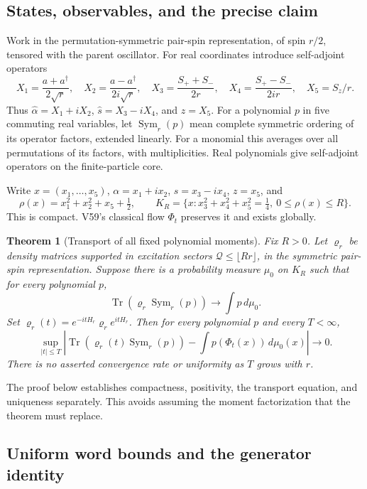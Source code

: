 \documentclass[11pt]{article}
\newtheorem{theorem}{Theorem}[section]
\theoremstyle{remark}
\begin{document}
\subsection{States, observables, and the precise claim}

Work in the permutation-symmetric pair-spin representation,
of spin \(r/2\), tensored with the parent oscillator.
For real coordinates introduce self-adjoint operators
\[
 X_1=\frac{a+a^\dagger}{2\sqrt r},\quad
 X_2=\frac{a-a^\dagger}{2i\sqrt r},\quad
 X_3=\frac{S_++S_-}{2r},\quad
 X_4=\frac{S_+-S_-}{2ir},\quad X_5=S_z/r .
\]
Thus \(\widehat\alpha=X_1+iX_2\),
\(\widehat s=X_3-iX_4\), and \(\widehat z=X_5\).
For a polynomial \(p\) in five commuting real variables,
let \(\operatorname{Sym}_r(p)\) mean complete symmetric
ordering of its operator factors, extended linearly.
For a monomial this averages over all permutations of
its factors, with multiplicities.  Real polynomials give
self-adjoint operators on the finite-particle core.

Write \(x=(x_1,\ldots,x_5)\), \(\alpha=x_1+ix_2\),
\(s=x_3-ix_4\), \(z=x_5\), and
\[
 \rho(x)=x_1^2+x_2^2+x_5+\tfrac12,\qquad
 K_R=\{x:x_3^2+x_4^2+x_5^2=\tfrac14,\ 0\leq\rho(x)\leq R\}.
\]
This is compact.  V59's classical flow \(\Phi_t\)
preserves it and exists globally.

\begin{theorem}[Transport of all fixed polynomial moments]
\label{thm:v20v61-transport}
Fix \(R>0\).  Let \(\varrho_r\) be density matrices supported
in excitation sectors
\(\mathcal Q\leq\lfloor Rr\rfloor\), in the symmetric
pair-spin representation.  Suppose there is a probability
measure \(\mu_0\) on \(K_R\) such that for every polynomial \(p\),
\[
 \operatorname{Tr}(\varrho_r\operatorname{Sym}_r(p))
                         \longrightarrow\int p\,d\mu_0 .
\]
Set \(\varrho_r(t)=e^{-itH_r}\varrho_re^{itH_r}\).
Then for every polynomial \(p\) and every \(T<\infty\),
\[
 \sup_{|t|\leq T}
 \left|\operatorname{Tr}(\varrho_r(t)\operatorname{Sym}_r(p))
               -\int p(\Phi_t(x))\,d\mu_0(x)\right|
                         \longrightarrow0.
\]
There is no asserted convergence rate or uniformity as \(T\)
grows with \(r\).
\end{theorem}

The proof below establishes compactness, positivity, the
transport equation, and uniqueness separately.  This avoids
assuming the moment factorization that the theorem must replace.

\subsection{Uniform word bounds and the generator identity}
\end{document}
